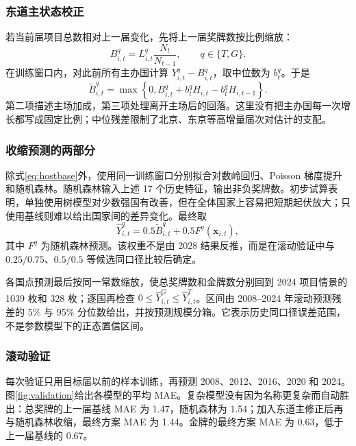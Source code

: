 \documentclass[UTF8,11pt,a4paper]{ctexart}
\begin{document}
\subsubsection{东道主状态校正}

若当前届项目总数相对上一届变化，先将上一届奖牌数按比例缩放：
\begin{equation}
B^q_{i,t}=L^q_{i,t}\frac{N_t}{N_{t-1}},\qquad q\in\{T,G\}.
\end{equation}
在训练窗口内，对此前所有主办国计算 $Y^q_{i,t}-B^q_{i,t}$，取中位数为 $b^q_t$。于是
\begin{equation}
\widetilde{B}^q_{i,t}=\max\left\{0,
B^q_{i,t}+b^q_t H_{i,t}-b^q_t H_{i,t-1}\right\}.
\label{eq:hostbase}
\end{equation}
第二项描述主场加成，第三项处理离开主场后的回落。这里没有把主办国每一次增长都写成固定比例；中位残差限制了北京、东京等高增量届次对估计的支配。

\subsubsection{收缩预测的两部分}

除式\eqref{eq:hostbase}外，使用同一训练窗口分别拟合对数岭回归、Poisson 梯度提升和随机森林。随机森林输入上述 17 个历史特征，输出非负奖牌数。初步试算表明，单独使用树模型对少数强国有改善，但在全体国家上容易把短期起伏放大；只使用基线则难以给出国家间的差异变化。最终取
\begin{equation}
\widehat{Y}^q_{i,t}=0.5\widetilde{B}^q_{i,t}+0.5F^q(\boldsymbol{x}_{i,t}),
\label{eq:blend}
\end{equation}
其中 $F^q$ 为随机森林预测。该权重不是由 2028 结果反推，而是在滚动验证中与 $0.25/0.75$、$0.5/0.5$ 等候选同口径比较后确定。

各国点预测最后按同一常数缩放，使总奖牌数和金牌数分别回到 2024 项目情景的 1039 枚和 328 枚；逐国再检查 $0\leq \widehat{Y}^G_{i,t}\leq \widehat{Y}^T_{i,t}$。区间由 2008--2024 年滚动预测残差的 5\% 与 95\% 分位数给出，并按预测规模分箱。它表示历史同口径误差范围，不是参数模型下的正态置信区间。

\subsubsection{滚动验证}

每次验证只用目标届以前的样本训练，再预测 2008、2012、2016、2020 和 2024。图\ref{fig:validation}给出各模型的平均 MAE。复杂模型没有因为名称更复杂而自动胜出：总奖牌的上一届基线 MAE 为 1.47，随机森林为 1.54；加入东道主修正后再与随机森林收缩，最终方案 MAE 为 1.44。金牌的最终方案 MAE 为 0.63，低于上一届基线的 0.67。
\end{document}
